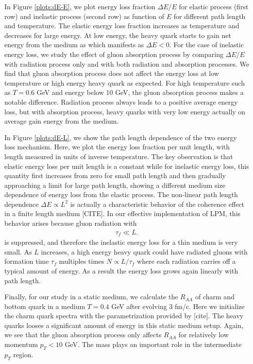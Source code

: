 \documentclass[aps, prc, reprint, amsmath, groupedaddress, nofootinbib]{revtex4-1}
\begin{document}
In Figure \ref{plots:dE-E}, we plot energy loss fraction $\Delta E/E$ for elastic process (first row) and inelastic process (second row) as function of $E$ for different path length and temperature.
The elastic energy loss fraction increases as temperature and decreases for large energy.
At low energy, the heavy quark starts to gain net energy from the medium as which manifests as $\Delta E < 0$.
For the case of inelastic energy loss, we study the effect of gluon absorption process by comparing $\Delta E/E$ with radiation process only and with both radiation and absorption processes.
We find that gluon absorption process does not affect the energy loss at low temperature or high energy heavy quark as expected.
For high temperature such as $T=0.6$ GeV and energy below $10$ GeV, the gluon absorption process makes a notable difference.
Radiation process always leads to a positive average energy loss, but with absorption process, heavy quarks with very low energy actually on average gain energy from the medium.

In Figure \ref{plots:dE-L}, we show the path length dependence of the two energy loss mechanism.
Here, we plot the energy loss fraction per unit length, with length measured in units of inverse temperature.
The key observation is that elastic energy loss per unit length is a constant while for inelastic energy loss, this quantity first increases from zero for small path length and then gradually approaching a limit for large path length, showing a different medium size dependence of energy loss from the elastic process.
The non-linear path length dependence $\Delta E \propto L^2$ is actually a characteristic behavior of the coherence effect in a finite length medium [CITE]. 
In our effective implementation of LPM, this behavior arises because gluon radiation with
\begin{eqnarray}
\tau_f \ll L.
\end{eqnarray}
is suppressed, and therefore the inelastic energy loss for a thin medium is very small.
As $L$ increases, a high energy heavy quark could have radiated gluons with formation time $\tau_f$ multiples times $N \propto L/\tau_f$ where each radiation carries off a typical amount of energy. 
As a result the energy loss grows again linearly with path length.

Finally, for our study in a static medium, we calculate the $R_{AA}$ of charm and bottom quark in a medium $T=0.4$ GeV after evolving $3$ fm/c.
Here we initialize the charm quark spectra with the parametrization provided by [cite].
The heavy quarks looses a significant amount of energy in this static medium setup.
Again, we see that the gluon absorption process only affects $R_{AA}$ for relatively low momentum $p_T < 10$ GeV.
The mass plays an important role in the intermediate $p_T$ region.
\end{document}
